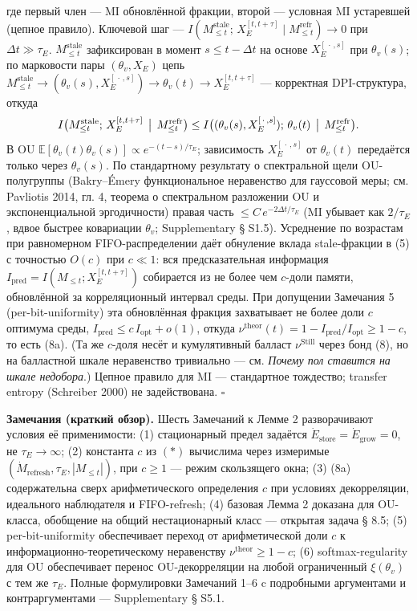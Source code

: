 \documentclass[pdflatex,sn-mathphys-ay]{sn-jnl}
\begin{document}
где первый член --- MI обновлённой фракции, второй --- условная MI устаревшей (цепное правило). Ключевой шаг --- \(I(M_{\le t}^{\text{stale}};\, X_E^{[t,t+\tau]} \mid M_{\le t}^{\text{refr}}) \to 0\) при \(\Delta t \gg \tau_E\). \(M_{\le t}^{\text{stale}}\) зафиксирован в момент \(s \le t - \Delta t\) на основе \(X_E^{[\,\cdot\,, s]}\) при \(\theta_v(s)\); по марковости пары \((\theta_v, X_E)\) цепь \(M_{\le t}^{\text{stale}} \to (\theta_v(s), X_E^{[\,\cdot\,,s]}) \to \theta_v(t) \to X_E^{[t,t+\tau]}\) --- корректная DPI-структура, откуда \[I\bigl(M_{\le t}^{\text{stale}};\, X_E^{[t,t+\tau]} \,\bigm|\, M_{\le t}^{\text{refr}}\bigr) \le I\bigl((\theta_v(s), X_E^{[\,\cdot\,,s]});\, \theta_v(t) \,\bigm|\, M_{\le t}^{\text{refr}}\bigr).\] В OU \(\mathbb{E}[\theta_v(t)\theta_v(s)] \propto e^{-(t-s)/\tau_E}\); зависимость \(X_E^{[\,\cdot\,,s]}\) от \(\theta_v(t)\) передаётся только через \(\theta_v(s)\). По стандартному результату о спектральной щели OU-полугруппы (Bakry--Émery функциональное неравенство для гауссовой меры; см. Pavliotis 2014, гл. 4, теорема о спектральном разложении OU и экспоненциальной эргодичности) правая часть \(\le C\,e^{-2\Delta t/\tau_E}\) (MI убывает как \(2/\tau_E\), вдвое быстрее ковариации \(\theta_v\); Supplementary § S1.5). Усреднение по возрастам при равномерном FIFO-распределении даёт обнуление вклада stale-фракции в (5) с точностью \(O(c)\) при \(c \ll 1\): вся предсказательная информация \(I_{\text{pred}} = I(M_{\le t}; X_E^{[t,t+\tau]})\) собирается из не более чем \(c\)-доли памяти, обновлённой за корреляционный интервал среды. При допущении Замечания 5 (per-bit-uniformity) эта обновлённая фракция захватывает не более доли \(c\) оптимума среды, \(I_{\text{pred}} \le c\, I_{\text{opt}} + o(1)\), откуда \(\nu^{\text{theor}}(t) = 1 - I_{\text{pred}}/I_{\text{opt}} \ge 1 - c\), то есть (8a). (Та же \(c\)-доля несёт и кумулятивный балласт \(\nu^{\text{Still}}\) через бонд (8), но на балластной шкале неравенство тривиально --- см. \emph{Почему пол ставится на шкале недобора}.) Цепное правило для MI --- стандартное тождество; transfer entropy (Schreiber 2000) не задействована. \(\square\)



\textbf{Замечания (краткий обзор).} Шесть Замечаний к Лемме 2 разворачивают условия её применимости: (1) стационарный предел задаётся \(\dot{E}_{\text{store}} = \dot{E}_{\text{grow}} = 0\), не \(\tau_E \to \infty\); (2) константа \(c\) из \((*)\) вычислима через измеримые \((\dot{M}_{\text{refresh}}, \tau_E, |M_{\le t}|)\), при \(c \ge 1\) --- режим скользящего окна; (3) (8a) содержательна сверх арифметического определения \(c\) при условиях декорреляции, идеального наблюдателя и FIFO-refresh; (4) базовая Лемма 2 доказана для OU-класса, обобщение на общий нестационарный класс --- открытая задача § 8.5; (5) per-bit-uniformity обеспечивает переход от арифметической доли \(c\) к информационно-теоретическому неравенству \(\nu^{\text{theor}} \ge 1-c\); (6) softmax-regularity для OU обеспечивает перенос OU-декорреляции на любой ограниченный \(\xi(\theta_v)\) с тем же \(\tau_E\). Полные формулировки Замечаний 1--6 c подробными аргументами и контраргументами --- Supplementary § S5.1.
\end{document}
